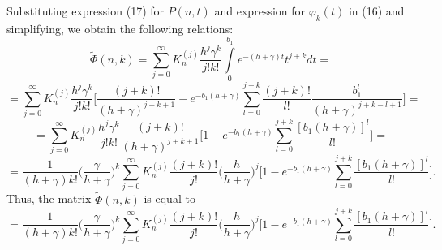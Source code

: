\documentclass[12pt, a4paper]{article}
\begin{document}
Substituting  expression (17) for $P(n,t)$ and expression for $\varphi_{k}(t)$ in (16) and simplifying, we obtain the following relations:
$$
\tilde{\Phi}(n,k)=\sum\limits_{j=0}^\infty K_n^{(j)} \frac{h^j\gamma^k}{j!k!} \int\limits_{0}^{b_1} e^{-(h+\gamma)t}t^{j+k}dt=
$$
$$=\sum\limits_{j=0}^\infty K_n^{(j)} \frac{h^j\gamma^k}{j!k!} \biggl[ \frac{(j+k)!}{(h+\gamma)^{j+k+1}}-e^{-b_1(h+\gamma)}\sum\limits_{l=0}^{j+k}\frac{(j+k)!}{l!}
\frac{b_1^l}{(h+\gamma)^{j+k-l+1}}\biggr]=
$$
$$
=\sum\limits_{j=0}^\infty K_n^{(j)} \frac{h^j\gamma^k}{j!k!}\frac{(j+k)!}{(h+\gamma)^{j+k+1}}\biggl[ 1-e^{-b_1(h+\gamma)}\sum\limits_{l=0}^{j+k}\frac{[b_1(h+\gamma)]^l}{l!}
\biggr]=
$$
$$=\frac{1}{(h+\gamma) k!}
\biggl(\frac{\gamma}{h+\gamma}\biggr)^k
\sum\limits_{j=0}^\infty K_n^{(j)}\frac{(j+k)!}{j!}
\biggl({\frac{h}{h+\gamma}}\biggr)^j \biggl[ 1-e^{-b_1(h+\gamma)}\sum\limits_{l=0}^{j+k}\frac{[b_1(h+\gamma)]^l}{l!}
\biggr].
$$
Thus, the matrix $\tilde{\Phi}(n,k)$ is equal to
$$=\frac{1}{(h+\gamma) k!}
\biggl(\frac{\gamma}{h+\gamma}\biggr)^k
\sum\limits_{j=0}^\infty K_n^{(j)}\frac{(j+k)!}{j!}
\biggl({\frac{h}{h+\gamma}}\biggr)^j \biggl[ 1-e^{-b_1(h+\gamma)}\sum\limits_{l=0}^{j+k}\frac{[b_1(h+\gamma)]^l}{l!}
\biggr].
$$
\end{document}
